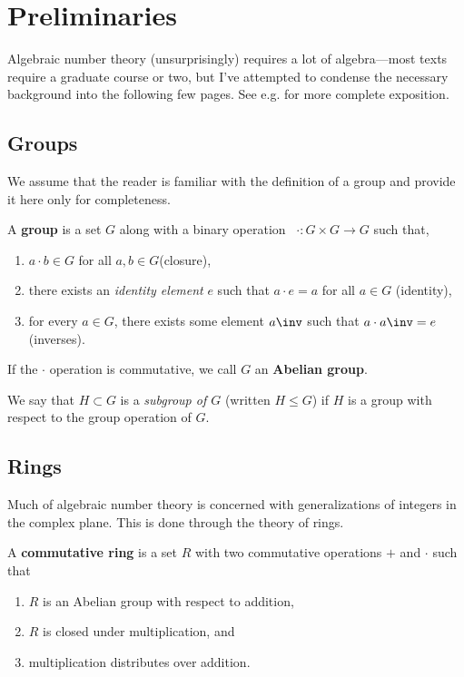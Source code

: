 \section{Preliminaries}
\label{sec:preliminaries}

Algebraic number theory (unsurprisingly) requires a lot of algebra---most texts require a graduate course or two, but I've attempted to condense the necessary background into the following few pages. See e.g. \textcite{dummit-foote} for more complete exposition.

\subsection{Groups}

We assume that the reader is familiar with the definition of a group and provide it here only for completeness.

\begin{definition}[Group]
    \label{def:group}
    A \textbf{group} is a set $G$ along with a binary operation \ $\cdot : G \times G \to G$ such that,
    \begin{enumerate}
        \item $a \cdot b \in G$ for all $a, b \in G$(closure),
        \item there exists an \emph{identity element} $e$ such that $a \cdot e = a$ for all $a \in G$ (identity),
        \item for every $a \in G$, there exists some element $a \inv$ such that $a \cdot a \inv = e$ (inverses).
    \end{enumerate}
    If the $\cdot$ operation is commutative, we call $G$ an \textbf{Abelian group}.
\end{definition}

\begin{definition}[Subgroup]
    We say that $H \subset G$ is a \emph{subgroup of $G$} (written $H \leq G$) if $H$ is a group with respect to the group operation of $G$.
\end{definition}

\subsection{Rings}

Much of algebraic number theory is concerned with generalizations of integers in the complex plane. This is done through the theory of rings.

\begin{definition}
    A \textbf{commutative ring} is a set $R$ with two commutative operations $+$ and $\cdot$ such that
    \begin{enumerate}
        \item $R$ is an Abelian group with respect to addition,
        \item $R$ is closed under multiplication, and
        \item multiplication distributes over addition.
    \end{enumerate}
\end{definition}

